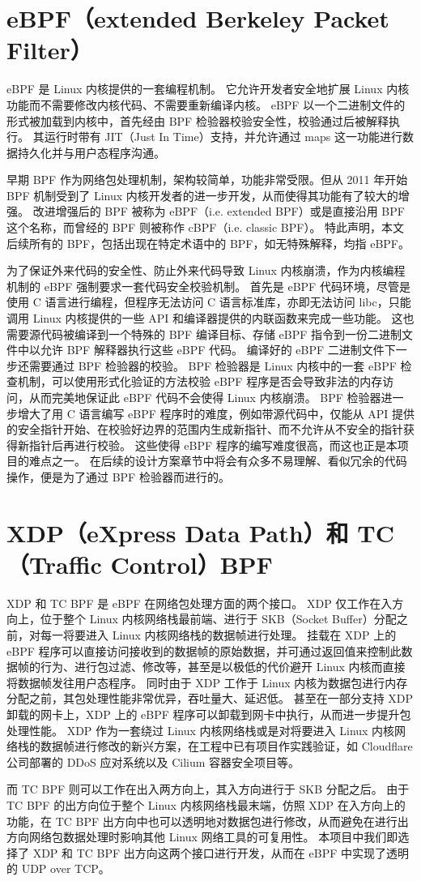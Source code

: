 \section{eBPF（extended Berkeley Packet Filter）}

eBPF\cite{10.1145/3371038} 是 Linux 内核提供的一套编程机制。
它允许开发者安全地扩展 Linux 内核功能而不需要修改内核代码、不需要重新编译内核。
eBPF 以一个二进制文件的形式被加载到内核中，首先经由 BPF 检验器校验安全性，校验通过后被解释执行。
其运行时带有 JIT（Just In Time）支持，并允许通过 maps 这一功能进行数据持久化并与用户态程序沟通。

早期 BPF 作为网络包处理机制，架构较简单，功能非常受限。但从 2011 年开始 BPF 机制受到了 Linux 内核开发者的进一步开发，从而使得其功能有了较大的增强。
改进增强后的 BPF 被称为 eBPF（i.e. extended BPF）或是直接沿用 BPF 这个名称，而曾经的 BPF 则被称作 cBPF（i.e. classic BPF）\cite{10.1145/3371038}。
特此声明，本文后续所有的 BPF，包括出现在特定术语中的 BPF，如无特殊解释，均指 eBPF。

为了保证外来代码的安全性、防止外来代码导致 Linux 内核崩溃，作为内核编程机制的 eBPF 强制要求一套代码安全校验机制。
首先是 eBPF 代码环境，尽管是使用 C 语言进行编程，但程序无法访问 C 语言标准库，亦即无法访问 libc，只能调用 Linux 内核提供的一些 API 和编译器提供的内联函数来完成一些功能。
这也需要源代码被编译到一个特殊的 BPF 编译目标、存储 eBPF 指令到一份二进制文件中以允许 BPF 解释器执行这些 eBPF 代码。
编译好的 eBPF 二进制文件下一步还需要通过 BPF 检验器的校验。
BPF 检验器是 Linux 内核中的一套 eBPF 检查机制，可以使用形式化验证的方法校验 eBPF 程序是否会导致非法的内存访问，从而完美地保证此 eBPF 代码不会使得 Linux 内核崩溃。
BPF 检验器进一步增大了用 C 语言编写 eBPF 程序时的难度，例如带源代码中，仅能从 API 提供的安全指针开始、在校验好边界的范围内生成新指针、而不允许从不安全的指针获得新指针后再进行校验。
这些使得 eBPF 程序的编写难度很高\cite{8850758}，而这也正是本项目的难点之一。
在后续的设计方案章节中将会有众多不易理解、看似冗余的代码操作，便是为了通过 BPF 检验器而进行的。

\section{XDP（eXpress Data Path）和 TC（Traffic Control）BPF}

XDP 和 TC BPF 是 eBPF 在网络包处理方面的两个接口。
XDP 仅工作在入方向上，位于整个 Linux 内核网络栈最前端、进行于 SKB（Socket Buffer）分配之前，对每一将要进入 Linux 内核网络栈的数据帧进行处理。
挂载在 XDP 上的 eBPF 程序可以直接访问接收到的数据帧的原始数据，并可通过返回值来控制此数据帧的行为、进行包过滤、修改等，甚至是以极低的代价避开 Linux 内核而直接将数据帧发往用户态程序。
同时由于 XDP 工作于 Linux 内核为数据包进行内存分配之前，其包处理性能非常优异，吞吐量大、延迟低\cite{8806651,8493077}。
甚至在一部分支持 XDP 卸载的网卡上，XDP 上的 eBPF 程序可以卸载到网卡中执行，从而进一步提升包处理性能\cite{kicinski2016ebpf}。
XDP 作为一套绕过 Linux 内核网络栈或是对将要进入 Linux 内核网络栈的数据帧进行修改的新兴方案，在工程中已有项目作实践验证，如 Cloudflare 公司部署的 DDoS 应对系统\cite{bertin2017xdp}以及 Cilium 容器安全项目等。

而 TC BPF 则可以工作在出入两方向上，其入方向进行于 SKB 分配之后。
由于 TC BPF 的出方向位于整个 Linux 内核网络栈最末端，仿照 XDP 在入方向上的功能，在 TC BPF 出方向中也可以透明地对数据包进行修改，从而避免在进行出方向网络包数据处理时影响其他 Linux 网络工具的可复用性。
本项目中我们即选择了 XDP 和 TC BPF 出方向这两个接口进行开发，从而在 eBPF 中实现了透明的 UDP over TCP。
